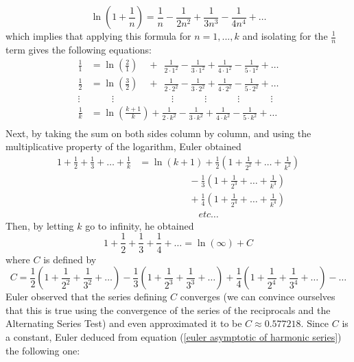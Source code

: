 $$\ln\left(1 + \frac{1}{n}\right) = \frac{1}{n} - \frac{1}{2n^2} + \frac{1}{3n^3} - \frac{1}{4n^4} + \dots$$
which implies that applying this formula for $n = 1,..., k$ and isolating for the $\frac{1}{n}$ term gives the following equations:
\begin{align*}
    \frac{1}{1} &= \ln\left(\frac{2}{1}\right) \quad + \ \  \frac{1}{2\cdot 1^2} - \frac{1}{3\cdot 1^2} + \frac{1}{4\cdot 1^2} - \frac{1}{5\cdot 1^2} + \dots \\
    \frac{1}{2} &= \ln\left(\frac{3}{2}\right)  \quad + \ \  \frac{1}{2\cdot 2^2} - \frac{1}{3\cdot 2^2} + \frac{1}{4\cdot 2^2} - \frac{1}{5\cdot 2^2} + \dots \\
    \vdots & \qquad \  \vdots \qquad \qquad \qquad \vdots \qquad \ \quad \vdots \qquad \ \quad \vdots \qquad \ \quad \vdots  \\
    \frac{1}{k} &= \ln\left(\frac{k+1}{k}\right) + \frac{1}{2\cdot k^2} - \frac{1}{3\cdot k^2} + \frac{1}{4\cdot k^2} - \frac{1}{5\cdot k^2} + \dots \\
\end{align*}
Next, by taking the sum on both sides column by column, and using the multiplicative property of the logarithm, Euler obtained 
\begin{align*}
    1 + \frac{1}{2} + \frac{1}{3} + \dots + \frac{1}{k} &= \ln(k+1) + \frac{1}{2}\left(1 + \frac{1}{2^2} + \dots + \frac{1}{k^2}\right) \\
    & \qquad \qquad \quad \  - \frac{1}{3}\left(1 + \frac{1}{2^3} + \dots + \frac{1}{k^3}\right)\\
    & \qquad \qquad \quad \  + \frac{1}{4}\left(1 + \frac{1}{2^4} + \dots + \frac{1}{k^4}\right) \\
    & \qquad \qquad \qquad \ etc \dots
\end{align*}
Then, by letting $k$ go to infinity, he obtained
\begin{equation} \label{euler asymptotic of harmonic series}
    1 + \frac{1}{2} + \frac{1}{3} + \frac{1}{4} + \dots = \ln(\infty) + C
\end{equation}
where $C$ is defined by
$$C = \frac{1}{2}\left(1 + \frac{1}{2^2} + \frac{1}{3^2} + \dots\right) - \frac{1}{3}\left(1 + \frac{1}{2^3} + \frac{1}{3^3} + \dots \right) + \frac{1}{4}\left(1 + \frac{1}{2^4} + \frac{1}{3^4} + \dots \right) - \dots$$
Euler observed that the series defining $C$ converges (we can convince ourselves that this is true using the convergence of the series of the reciprocals and the Alternating Series Test) and even approximated it to be $C \approx 0.577218$. Since $C$ is a constant, Euler deduced from equation (\ref{euler asymptotic of harmonic series}) the following one:
